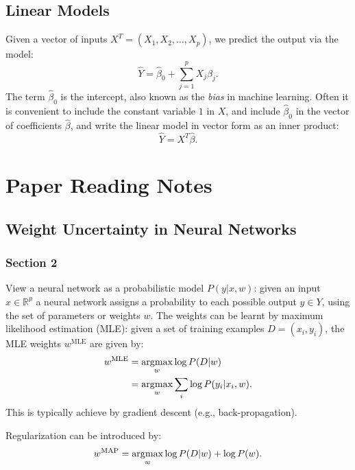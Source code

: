 \subsection[Linear Models]{Linear Models~\cite{friedman2001elements}}
\label{sec:linear_model}
Given a vector of inputs $X^T = \left(X_1, X_2,...,X_p \right)$, we predict the output via the model:
\begin{equation}
    \hat{Y} = \hat{\beta}_0 + \sum_{j=1}^{p} X_j \hat{\beta}_j.
\end{equation}
The term $\hat{\beta}_0$ is the intercept, also known as the \emph{bias} in machine learning. Often it is convenient to include the constant variable $1$ in $X$, and include $\hat{\beta}_0$ in the vector of coefficients $\hat{\beta}$, and write the linear model in vector form as an inner product:
\begin{equation}
    \hat{Y} = X^T \hat{\beta}.
\end{equation}

\section{Paper Reading Notes}
\subsection{Weight Uncertainty in Neural Networks}
\subsubsection{Section 2}
View a neural network as a probabilistic model $P(y|x,w)$: given an input $x \in \mathbb{R}^p$ a neural network assigns a probability to each possible output $y \in Y$, using the set of parameters or weights $w$. The weights can be learnt by maximum likelihood estimation (MLE): given a set of training examples $D=(x_i,y_i)$, the MLE weights $w^{\text{MLE}}$ are given by:
\begin{align}
    w^{\text{MLE}} &= \operatorname*{arg\!\max}_{w} \log P(D|w)\\
    &= \operatorname*{arg\!\max}_{w} \sum_i \log P(y_i | x_i, w).
\end{align}
This is typically achieve by gradient descent (e.g., back-propagation).

Regularization can be introduced by:
\begin{equation}
    w^{\text{MAP}} = \operatorname*{arg\!\max}_{w} \log P(D|w) + \log P(w).
    \label{eq:bayesian_mle_map}
\end{equation}

